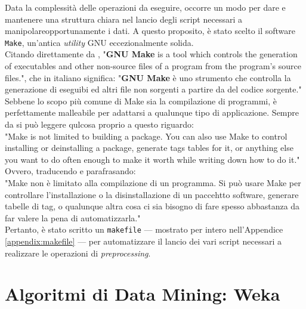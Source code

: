     Data la complessità delle operazioni da eseguire, occorre un modo per dare e mantenere una struttura chiara nel lancio degli script necessari a manipolareopportunamente i dati. A questo proposito, è stato scelto il software \texttt{Make}, un'antica \textit{utility} GNU eccezionalmente solida. \\

    Citando direttamente da \cite{make}, "\textbf{GNU Make} is a tool which controls the generation of executables and other non-source files of a program from the program's source files.", che in italiano significa: "\textbf{GNU Make} è uno strumento che controlla la generazione di eseguibi ed altri file non sorgenti a partire da del codice sorgente."\\

    Sebbene lo scopo più comune di Make sia la compilazione di programmi, è perfettamente malleabile per adattarsi a qualunque tipo di applicazione. Sempre da \cite{make} si può leggere qulcosa proprio a questo riguardo: \\

    "Make is not limited to building a package. You can also use Make to control installing or deinstalling a package, generate tags tables for it, or anything else you want to do often enough to make it worth while writing down how to do it." \\

    Ovvero, traducendo e parafrasando:\\

    "Make non è limitato alla compilazione di un programma. Si può usare Make per controllare l'installazione o la disinstallazione di un paccehtto software, generare tabelle di tag, o qualunque altra cosa ci sia bisogno di fare spesso abbastanza da far valere la pena di automatizzarla." \\

    Pertanto, è stato scritto un \texttt{makefile} --- mostrato per intero nell'Appendice \ref{appendix:makefile} --- per automatizzare il lancio dei vari script necessari a realizzare le operazioni di \textit{preprocessing}.

\section{Algoritmi di Data Mining: Weka}


